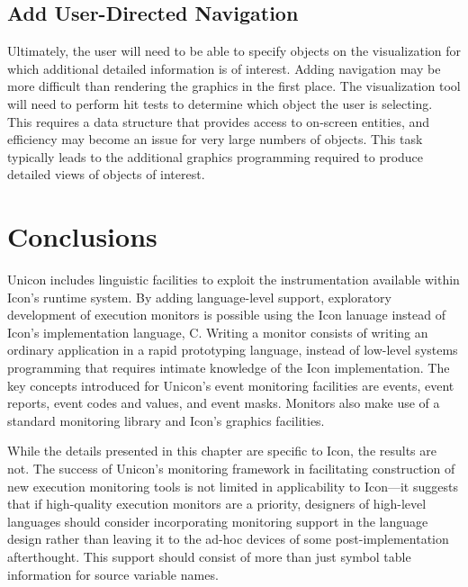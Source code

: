 
\subsection*{Add User-Directed Navigation}

Ultimately, the user will need to be able to specify objects on the
visualization for which additional detailed information is of interest.
Adding navigation may be more difficult than rendering the graphics in the
first place.  The visualization tool will need to perform hit tests to
determine which object the user is selecting.  This requires a data
structure that provides access to on-screen entities, and efficiency may
become an issue for very large numbers of objects.  This task typically
leads to the additional graphics programming required to produce detailed
views of objects of interest.


\section{Conclusions}

Unicon includes linguistic facilities to exploit the instrumentation
available within Icon's runtime system.  By adding language-level support,
exploratory development of execution monitors is possible using the Icon
lanuage instead of Icon's implementation language, C.  Writing a monitor
consists of writing an ordinary application in a rapid prototyping language,
instead of low-level systems programming that requires intimate knowledge of
the Icon implementation.
The key concepts introduced for Unicon's event monitoring facilities are
events, event reports, event codes and values, and event masks.  Monitors
also make use of a standard monitoring library and Icon's graphics
facilities.

While the details presented in this chapter are specific to Icon, the results
are not.  The success of Unicon's monitoring framework in facilitating
construction of new execution monitoring tools is not limited in
applicability to Icon---it suggests that if high-quality execution
monitors are a priority, designers of high-level languages should consider
incorporating monitoring support in the language design rather than leaving
it to the ad-hoc devices of some post-implementation afterthought.  This
support should consist of more than just symbol table information for
source variable names.
